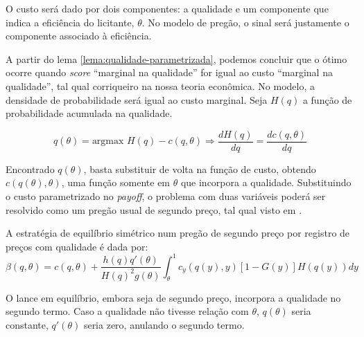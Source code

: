 O custo será dado por dois componentes: a qualidade e um componente que indica a eficiência do licitante, $\theta$. No modelo de pregão, o sinal será justamente o componente associado à eficiência.

A partir do lema \ref{lema:qualidade-parametrizada}, podemos concluir que o ótimo ocorre quando \emph{score} ``marginal na qualidade'' for igual ao custo ``marginal na qualidade'', tal qual corriqueiro na nossa teoria econômica. No modelo, a densidade de probabilidade será igual ao custo marginal. Seja $H(q)$ a função de probabilidade acumulada na qualidade.

\begin{equation}
	q(\theta) = \text{argmax } H(q) - c(q, \theta) \Rightarrow \frac{dH(q)}{dq} = \frac{dc(q, \theta)}{dq}
\end{equation}

Encontrado $q(\theta)$, basta substituir de volta na função de custo, obtendo $c(q(\theta), \theta)$, uma função somente em $\theta$ que incorpora a qualidade. Substituindo o custo parametrizado no \emph{payoff}, o problema com duas variáveis poderá ser resolvido como um pregão usual de segundo preço, tal qual visto em \citet{Che1993}.

\begin{proposicao}
	\label{prop:nash-pregao-segundo-preco-qualidade}
	A estratégia de equilíbrio simétrico num pregão de segundo preço por registro de preços com qualidade é dada por:
	\begin{equation}
		\beta(q, \theta) = c(q, \theta) + \frac{h(q)q'(\theta)}{H(q)^2g(\theta)}\int_{\theta}^1 c_{y}(q(y), y)[1-G(y)]H(q(y))dy
	\end{equation}
\end{proposicao}

O lance em equilíbrio, embora seja de segundo preço, incorpora a qualidade no segundo termo. Caso a qualidade não tivesse relação com $\theta$, $q(\theta)$ seria constante, $q'(\theta)$ seria zero, anulando o segundo termo.